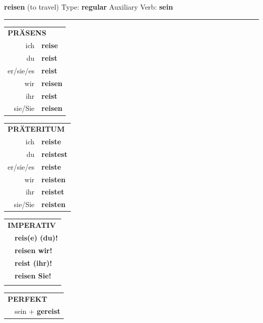 \documentclass[10pt,a4paper]{revtex4-2}
\begin{document}
\begin{verbbox}
    {\Large \bf reisen} (to travel) \hfill Type: \textbf{regular} \hfill Auxiliary Verb: \textbf{sein} 
    
     \vspace{5pt}

    \hrule
    
    \vspace{5pt}

  \begin{tabular}{rl}
     \multicolumn{2}{l}{\textbf{PRÄSENS} }\\
    ich & \textbf{reise}\\
    du & \textbf{reist}\\
    er/sie/es & \textbf{reist}\\
    wir & \textbf{reisen}\\
    ihr & \textbf{reist}\\
    sie/Sie & \textbf{reisen}\\
  \end{tabular}
  \hfill
     \begin{tabular}{rl}
    \multicolumn{2}{l}{\textbf{PRÄTERITUM} }\\
    ich & \textbf{reiste}\\
    du & \textbf{reistest}\\
    er/sie/es & \textbf{reiste}\\
    wir & \textbf{reisten}\\
    ihr & \textbf{reistet}\\
    sie/Sie & \textbf{reisten}\\
  \end{tabular}
  \hfill
  \begin{tabular}{rl}
     \multicolumn{2}{l}{\textbf{IMPERATIV} }\\
   & \textbf{reis(e) (du)!}\\
   & \textbf{reisen wir!}\\
   & \textbf{reist (ihr)!}\\
   & \textbf{reisen Sie!}\\
   & \vspace{10pt}
  \end{tabular}

    \vspace{10pt}

 \begin{tabular}{rl}
     \multicolumn{2}{l}{\textbf{PERFEKT}}\\
   & sein + \textbf{gereist}\\
  \end{tabular}
\hfill
   \begin{tabular}{rl}
   

\end{tabular}
\end{verbbox}
\end{document}
